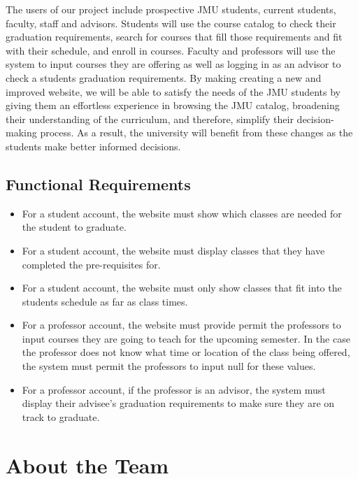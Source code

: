 \documentclass[11pt]{article}
\begin{document}
The users of our project include prospective JMU students, current students, faculty, staff and advisors. Students will use the course catalog to check their graduation requirements, search for courses that fill those requirements and fit with their schedule, and enroll in courses. Faculty and professors will use the system to input courses they are offering as well as logging in as an advisor to check a students graduation requirements. By making creating a new and improved website, we will be able to satisfy the needs of the JMU students by giving them an effortless experience in browsing the JMU catalog, broadening their understanding of the curriculum, and therefore, simplify their decision-making process. As a result, the university will benefit from these changes as the students make better informed decisions.  

\subsection*{Functional Requirements}
\begin{itemize}
  \item For a student account, the website must show which classes are needed for the student to graduate.
  \item For a student account, the website must display classes that they have completed the pre-requisites for.
  \item  For a student account, the website must only show classes that fit into the students schedule as far as class times.
  \item  For a professor account, the website must provide permit the professors to input courses they are going to teach for the upcoming semester. In the case the professor does not know what time or location of the class being offered, the system must permit the professors to input null for these values.
  \item  For a professor account, if the professor is an advisor, the system must display their advisee's graduation requirements to make sure they are on track to graduate.
\end{itemize}
\section*{About the Team}
\end{document}
